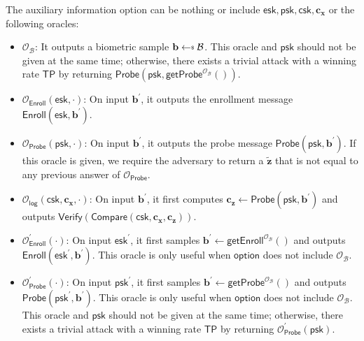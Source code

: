 The auxiliary information \textsf{option} can be nothing or include $\textsf{esk}, \textsf{psk}, \textsf{csk}, \mathbf{c_x}$ or the following oracles:

\begin{itemize}

	\item $\mathcal{O}_{\mathcal{B}}$: It outputs a biometric sample $\mathbf{b} \getsdollar \mathcal{B}$. This oracle and $\textsf{psk}$ should not be given at the same time; otherwise, there exists a trivial attack with a winning rate $\textsf{TP}$ by returning $\textsf{Probe}(\textsf{psk}, \textsf{getProbe}^{ \mathcal{O}_\mathcal{B} }() )$.
	
	\item $\mathcal{O}_\textsf{Enroll}(\textsf{esk}, \cdot)$: On input $\mathbf{b}^\prime$, it outputs the enrollment message $\textsf{Enroll}(\textsf{esk}, \mathbf{b}^\prime)$.

	\item $\mathcal{O}_\textsf{Probe}(\textsf{psk}, \cdot)$: On input $\mathbf{b}^\prime$, it outputs the probe message $\textsf{Probe}(\textsf{psk}, \mathbf{b}^\prime)$. If this oracle is given, we require the adversary to return a $\mathbf{\tilde{z}}$ that is not equal to any previous answer of $\mathcal{O}_\textsf{Probe}$.
	
	\item $\mathcal{O}_\textsf{log}(\textsf{csk}, \mathbf{c_x}, \cdot)$: On input $\mathbf{b}^\prime$, it first computes $\mathbf{c_z} \gets \textsf{Probe}(\textsf{psk}, \mathbf{b}^\prime)$ and outputs $\textsf{Verify}(\textsf{Compare}(\textsf{csk}, \mathbf{c_x}, \mathbf{c_z} ) )$.
	
	\item $\mathcal{O}_\textsf{Enroll}^\prime (\cdot)$: On input $\textsf{esk}^\prime$, it first samples $\mathbf{b}^\prime \gets \textsf{getEnroll}^{\mathcal{O}_{\mathcal{B}}}()$ and outputs $\textsf{Enroll}(\textsf{esk}^\prime, \mathbf{b}^\prime)$. This oracle is only useful when $\textsf{option}$ does not include $\mathcal{O}_{\mathcal{B}}$.

	\item $\mathcal{O}_\textsf{Probe}^\prime (\cdot)$: On input $\textsf{psk}^\prime$, it first samples $\mathbf{b}^\prime \gets \textsf{getProbe}^{\mathcal{O}_{\mathcal{B}}}()$ and outputs $\textsf{Probe}(\textsf{psk}^\prime, \mathbf{b}^\prime)$. This oracle is only useful when $\textsf{option}$ does not include $\mathcal{O}_{\mathcal{B}}$. This oracle and $\textsf{psk}$ should not be given at the same time; otherwise, there exists a trivial attack with a winning rate $\textsf{TP}$ by returning $\mathcal{O}_{\textsf{Probe}}^\prime (\textsf{psk})$.
	
\end{itemize}

